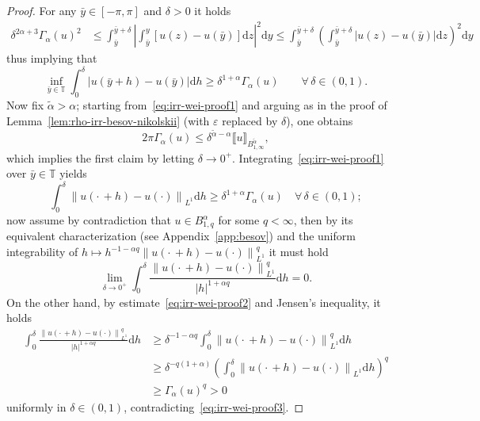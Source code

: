 \documentclass[11pt,oneside,reqno]{amsart}
\newcommand{\mathd}{\mathrm{d}}
\numberwithin{equation}{section}
\begin{document}
\begin{proof}
  For any $\bar{y} \in [- \pi, \pi]$ and $\delta > 0$ it holds
%  
  \begin{align*}
    \delta^{2 \alpha + 3} \Gamma_{\alpha} (u)^2 & \leqslant
    \int_{\bar{y}}^{\bar{y} + \delta} \left| \int_{\bar{y}}^y [u (z) - u
    (\bar{y})] \mathd z \right|^2 \mathd y
    \leqslant \int_{\bar{y}}^{\bar{y} + \delta} \left(
    \int_{\bar{y}}^{\bar{y} + \delta} | u (z) - u (\bar{y}) | \mathd z
    \right)^2 \mathd y
  \end{align*}
%  
  thus implying that
  \begin{equation}
    \inf_{\bar{y} \in \mathbb{T}} \int_0^{\delta} | u (\bar{y} + h) - u
    (\bar{y}) | \mathd h \geqslant \delta^{1 + \alpha} \Gamma_{\alpha} (u)
    \qquad \forall \, \delta \in (0, 1) . \label{eq:irr-wei-proof1}
  \end{equation}
  Now fix $\tilde{\alpha} > \alpha$; starting from~\eqref{eq:irr-wei-proof1}
  and arguing as in the proof of Lemma~\ref{lem:rho-irr-besov-nikolskii} (with
  $\varepsilon$ replaced by $\delta$), one obtains
  \[ 2 \pi \Gamma_{\alpha} (u) \leqslant \delta^{\tilde{\alpha} - \alpha}
     \llbracket u \rrbracket_{B^{\tilde{\alpha}}_{1, \infty}}, \]
  which implies the first claim by letting $\delta \rightarrow 0^+$.
  Integrating~\eqref{eq:irr-wei-proof1} over $\bar{y} \in \mathbb{T}$ yields
  \begin{equation}
    \int_0^{\delta} \left\| u \left( \cdot \, + h \right) - u (\cdot)
    \right\|_{L^1} \mathd h \geqslant \delta^{1 + \alpha} \Gamma_{\alpha} (u)
    \quad \forall \, \delta \in (0, 1) ; \label{eq:irr-wei-proof2}
  \end{equation}
  now assume by contradiction that $u \in B^{\alpha}_{1, q}$ for some $q <
  \infty$, then by its equivalent characterization (see
  Appendix~\ref{app:besov}) and the uniform integrability of $h \mapsto h^{- 1
  - \alpha q} \left\| u \left( \cdot \, + h \right) - u (\cdot)
  \right\|^q_{L^1}$ it must hold
  \begin{equation}
    \lim_{\delta \rightarrow 0^+} \int_0^{\delta} \frac{\left\| u \left( \cdot
    \, + h \right) - u (\cdot) \right\|_{L^1}^q}{| h |^{1 + \alpha q}} \mathd
    h = 0. \label{eq:irr-wei-proof3}
  \end{equation}
  On the other hand, by estimate~\eqref{eq:irr-wei-proof2} and Jensen's
  inequality, it holds
%  
  \begin{align*}
    \int_0^{\delta} \frac{\left\| u \left( \cdot \, + h \right) - u (\cdot)
    \right\|_{L^1}^q}{| h |^{1 + \alpha q}} \mathd h & \geqslant \delta^{- 1 -
    \alpha q} \int_0^{\delta} \left\| u \left( \cdot \, + h \right) - u
    (\cdot) \right\|_{L^1}^q \mathd h\\
    & \geqslant \delta^{- q (1 + \alpha)} \left( \int_0^{\delta} \left\| u
    \left( \cdot \, + h \right) - u (\cdot) \right\|_{L^1} \mathd h
    \right)^q\\
    & \geqslant \Gamma_{\alpha} (u)^q > 0
  \end{align*}
%  
  uniformly in $\delta \in (0, 1)$, contradicting~\eqref{eq:irr-wei-proof3}.
\end{proof}
\end{document}

